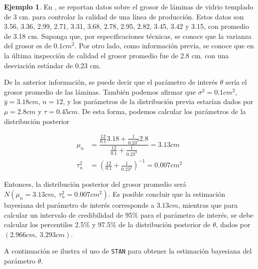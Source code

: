 \documentclass[
  10pt,
  spanish,
]{book}
\theoremstyle{definition}
\theoremstyle{definition}
\newtheorem{example}{Ejemplo}[chapter]
\theoremstyle{definition}
\theoremstyle{definition}
\theoremstyle{remark}
\begin{document}
\begin{example}
\protect\hypertarget{exm:unnamed-chunk-73}{}{\label{exm:unnamed-chunk-73} }En \citet[Ej. 2.3.6]{Zhang}, se reportan datos sobre el grosor de láminas de vidrio templado de 3 cm. para controlar la calidad de una línea de producción. Estos datos son 3.56, 3.36, 2.99, 2.71, 3.31, 3.68, 2.78, 2.95, 2.82, 3.45, 3.42 y 3.15, con promedio de 3.18 cm. Suponga que, por especificaciones técnicas, se conoce que la varianza del grosor es de \(0.1 cm^2\). Por otro lado, como información previa, se conoce que en la última inspección de calidad el grosor promedio fue de 2.8 cm. con una desviación estándar de 0.23 cm.

De la anterior información, se puede decir que el parámetro de interés \(\theta\) sería el grosor promedio de las láminas. También podemos afirmar que \(\sigma^2=0.1cm^2\), \(\bar{y}=3.18cm\), \(n=12\), y los parámetros de la distribución previa estarían dados por \(\mu=2.8cm\) y \(\tau=0.45cm\). De esta forma, podemos calcular los parámetros de la distribución posterior

\begin{align*}
\mu_n
&=\dfrac{\frac{12}{0.1}3.18+\frac{1}{0.23^2}2.8}{\frac{12}{0.1}+\frac{1}{0.23^2}}=3.13cm\\
\tau^2_n
&=\left(\frac{12}{0.1}+\frac{1}{0.23^2}\right)^{-1}=0.007cm^2
\end{align*}

Entonces, la distribución posterior del grosor promedio será \(N(\mu_n=3.13cm,\ \tau^2_n=0.007cm^2)\). Es posible concluir que la estimación bayesiana del parámetro de interés corresponde a \(3.13cm\), mientras que para calcular un intervalo de credibilidad de 95\% para el parámetro de interés, se debe calcular los percentiles 2.5\% y 97.5\% de la distribución posterior de \(\theta\), dados por \((2.966cm,\ 3.293cm)\).

A continuación se ilustra el uso de \texttt{STAN} para obtener la estimación bayesiana del parámetro \(\theta\).
\end{example}
\end{document}
